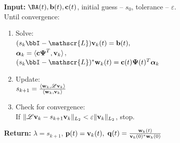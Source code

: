 \documentclass[pdflatex,sn-mathphys-num]{sn-jnl}%
\theoremstyle{thmstyleone}%
\theoremstyle{thmstyletwo}%
\theoremstyle{thmstylethree}%
\def\Bb{{\bf b}}  \def\BB{{\bf B}}
\def\Bc{{\bf c}}  \def\BC{{\bf C}}
\def\Bp{{\bf p}}  \def\BP{{\bf P}}
\def\Bq{{\bf q}}  \def\BQ{{\bf Q}}
\def\Bv{{\bf v}}  \def\BV{{\bf V}}
\def\Bw{{\bf w}}  \def\BW{{\bf W}}
\def\Lop{\mathscr{L}}
\def\Balpha{{\boldsymbol{\alpha}}}
\def\BPsi{{\boldsymbol{\Psi}}}
\begin{document}
\begin{algorithm} [h!]
\caption{{\small LTP}-{\small DPA} }
\label{alg:ltpdpa}
\textbf{Input:} $\BA(t),\Bb(t),\Bc(t)$, initial guess -- $s_0$, tolerance -- $\varepsilon$.\\
Until convergence:
\begin{enumerate}
    \item Solve: \\
    $(s_k\bbI-\Lop) {\Bv_k(t)}=\Bb(t),$\\
    $\Balpha_k = \langle \Bc\BPsi^T,\Bv_k\rangle$, \\
    $(s_k\bbI-\Lop)^* \Bw_k(t)=\Bc(t)\BPsi(t)^T\Balpha_k$ 
    \item Update:\\
    $
    s_{k+1} = \frac{\langle\Bw_k,\Lop\Bv_k\rangle}{\langle\Bw_k,\Bv_k\rangle}
    $
     
    \item Check for convergence:\\
    If $\|\Lop\Bv_k-s_{k+1}\Bv_k\|_{L_2}<\varepsilon\|\Bv_k\|_{L_2}$, stop.
    \end{enumerate}
    \textbf{Return:} $\lambda = s_{k+1}$, $\Bp(t)=\Bv_k(t),$ $\Bq(t)=\frac{\Bw_k(t)}{\Bv_k(0)^*\Bw_k(0)}$
\end{algorithm}
\end{document}
